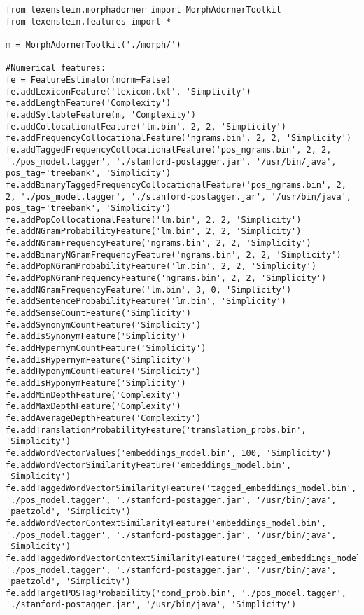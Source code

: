 \begin{lstlisting}
from lexenstein.morphadorner import MorphAdornerToolkit
from lexenstein.features import *

m = MorphAdornerToolkit('./morph/')

#Numerical features:
fe = FeatureEstimator(norm=False)
fe.addLexiconFeature('lexicon.txt', 'Simplicity')
fe.addLengthFeature('Complexity')
fe.addSyllableFeature(m, 'Complexity')
fe.addCollocationalFeature('lm.bin', 2, 2, 'Simplicity')
fe.addFrequencyCollocationalFeature('ngrams.bin', 2, 2, 'Simplicity')
fe.addTaggedFrequencyCollocationalFeature('pos_ngrams.bin', 2, 2, './pos_model.tagger', './stanford-postagger.jar', '/usr/bin/java', pos_tag='treebank', 'Simplicity')
fe.addBinaryTaggedFrequencyCollocationalFeature('pos_ngrams.bin', 2, 2, './pos_model.tagger', './stanford-postagger.jar', '/usr/bin/java', pos_tag='treebank', 'Simplicity')
fe.addPopCollocationalFeature('lm.bin', 2, 2, 'Simplicity')
fe.addNGramProbabilityFeature('lm.bin', 2, 2, 'Simplicity')
fe.addNGramFrequencyFeature('ngrams.bin', 2, 2, 'Simplicity')
fe.addBinaryNGramFrequencyFeature('ngrams.bin', 2, 2, 'Simplicity')
fe.addPopNGramProbabilityFeature('lm.bin', 2, 2, 'Simplicity')
fe.addPopNGramFrequencyFeature('ngrams.bin', 2, 2, 'Simplicity')
fe.addNGramFrequencyFeature('lm.bin', 3, 0, 'Simplicity')
fe.addSentenceProbabilityFeature('lm.bin', 'Simplicity')
fe.addSenseCountFeature('Simplicity')
fe.addSynonymCountFeature('Simplicity')
fe.addIsSynonymFeature('Simplicity')
fe.addHypernymCountFeature('Simplicity')
fe.addIsHypernymFeature('Simplicity')
fe.addHyponymCountFeature('Simplicity')
fe.addIsHyponymFeature('Simplicity')
fe.addMinDepthFeature('Complexity')
fe.addMaxDepthFeature('Complexity')
fe.addAverageDepthFeature('Complexity')
fe.addTranslationProbabilityFeature('translation_probs.bin', 'Simplicity')
fe.addWordVectorValues('embeddings_model.bin', 100, 'Simplicity')
fe.addWordVectorSimilarityFeature('embeddings_model.bin', 'Simplicity')
fe.addTaggedWordVectorSimilarityFeature('tagged_embeddings_model.bin', './pos_model.tagger', './stanford-postagger.jar', '/usr/bin/java', 'paetzold', 'Simplicity')
fe.addWordVectorContextSimilarityFeature('embeddings_model.bin', './pos_model.tagger', './stanford-postagger.jar', '/usr/bin/java', 'Simplicity')
fe.addTaggedWordVectorContextSimilarityFeature('tagged_embeddings_model.bin', './pos_model.tagger', './stanford-postagger.jar', '/usr/bin/java', 'paetzold', 'Simplicity')
fe.addTargetPOSTagProbability('cond_prob.bin', './pos_model.tagger', './stanford-postagger.jar', '/usr/bin/java', 'Simplicity')

\end{lstlisting}
